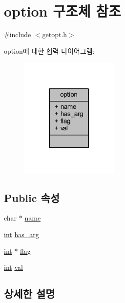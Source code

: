\hypertarget{structoption}{}\section{option 구조체 참조}
\label{structoption}


{\ttfamily \#include $<$getopt.\+h$>$}



option에 대한 협력 다이어그램\+:\nopagebreak
\begin{figure}[H]
\begin{center}
\leavevmode
\includegraphics[width=140pt]{structoption__coll__graph}
\end{center}
\end{figure}
\subsection*{Public 속성}
\begin{DoxyCompactItemize}
\item 
char $\ast$ \mbox{\hyperlink{structoption_a92c850a23c7828c1dba453bf8d15e1f0}{name}}
\item 
\mbox{\hyperlink{_util_8cpp_a0ef32aa8672df19503a49fab2d0c8071}{int}} \mbox{\hyperlink{structoption_a90d7ee9a51eea5c002682dbd0af149e4}{has\+\_\+arg}}
\item 
\mbox{\hyperlink{_util_8cpp_a0ef32aa8672df19503a49fab2d0c8071}{int}} $\ast$ \mbox{\hyperlink{structoption_ab366eea5fe7be25c1928328ba715e353}{flag}}
\item 
\mbox{\hyperlink{_util_8cpp_a0ef32aa8672df19503a49fab2d0c8071}{int}} \mbox{\hyperlink{structoption_a13bd155ec3b405d29c41ab8d0793be11}{val}}
\end{DoxyCompactItemize}


\subsection{상세한 설명}


